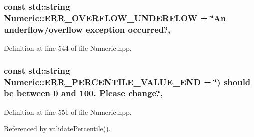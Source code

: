 \hypertarget{classmultiscale_1_1Numeric_aa56bde8322d97ccc99c252b951d44a9d}{
\subsubsection[{E\-R\-R\-\_\-\-O\-V\-E\-R\-F\-L\-O\-W\-\_\-\-U\-N\-D\-E\-R\-F\-L\-O\-W}]{\setlength{\rightskip}{0pt plus 5cm}const std\-::string Numeric\-::\-E\-R\-R\-\_\-\-O\-V\-E\-R\-F\-L\-O\-W\-\_\-\-U\-N\-D\-E\-R\-F\-L\-O\-W = \char`\"{}An underflow/overflow exception occurred.\char`\"{}\hspace{0.3cm}{\ttfamily [static]}, {\ttfamily [private]}}}\label{classmultiscale_1_1Numeric_aa56bde8322d97ccc99c252b951d44a9d}


Definition at line 544 of file Numeric.\-hpp.

\hypertarget{classmultiscale_1_1Numeric_a0f89f3a8ecbc3709bac3f04b83819bf6}{
\subsubsection[{E\-R\-R\-\_\-\-P\-E\-R\-C\-E\-N\-T\-I\-L\-E\-\_\-\-V\-A\-L\-U\-E\-\_\-\-E\-N\-D}]{\setlength{\rightskip}{0pt plus 5cm}const std\-::string Numeric\-::\-E\-R\-R\-\_\-\-P\-E\-R\-C\-E\-N\-T\-I\-L\-E\-\_\-\-V\-A\-L\-U\-E\-\_\-\-E\-N\-D = \char`\"{}) should be between 0 and 100. Please change.\char`\"{}\hspace{0.3cm}{\ttfamily [static]}, {\ttfamily [private]}}}\label{classmultiscale_1_1Numeric_a0f89f3a8ecbc3709bac3f04b83819bf6}


Definition at line 551 of file Numeric.\-hpp.



Referenced by validate\-Percentile().

